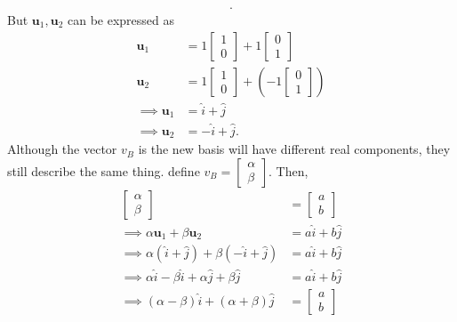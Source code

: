\documentclass{report}
\begin{document}
\begin{itemize}
\begin{align*}
            .\end{align*}
            But $\mathbf{u}_{1}, \mathbf{u}_{2}$ can be expressed as
            \begin{align*}
                \mathbf{u}_{1} & =1 \begin{bmatrix}1 \\ 0 \end{bmatrix} + 1 \begin{bmatrix} 0  \\ 1\end{bmatrix} \\
                \mathbf{u}_{2} & =1 \begin{bmatrix}1 \\ 0 \end{bmatrix} + \left(-1 \begin{bmatrix} 0  \\ 1\end{bmatrix}\right) \\
                \implies \mathbf{u}_{1} &= \hat{i} + \hat{j} \\
                \implies \mathbf{u}_{2} &= -\hat{i} + \hat{j}
            .\end{align*}
            Although the vector $v_{B}$ is the new basis will have different real components, they still describe the same thing. define $v_{B} = \begin{bmatrix} \alpha \\ \beta \end{bmatrix}$. Then,
            \begin{align*}
                \begin{bmatrix} \alpha \\ \beta \end{bmatrix} &= \begin{bmatrix} a \\ b\end{bmatrix} \\
                \implies \alpha \mathbf{u}_{1} + \beta \mathbf{u}_{2} &= a\hat{i} + b\hat{j} \\
                \implies  \alpha(\hat{i} + \hat{j}) +\beta(-\hat{i} + \hat{j}) &= a\hat{i} + b\hat{j} \\
                \implies \alpha\hat{i} - \beta\hat{i} + \alpha\hat{j} + \beta\hat{j} &= a\hat{i} + b\hat{j}  \\
                \implies (\alpha - \beta )\hat{i} + (\alpha + \beta)\hat{j} &= \begin{bmatrix} a \\ b\end{bmatrix} \\

\end{align*}
\end{itemize}
\end{document}
